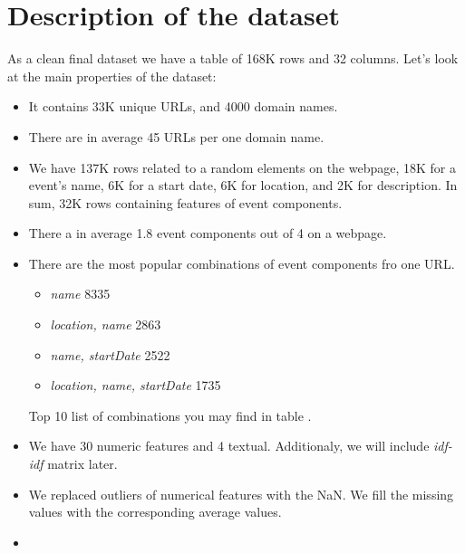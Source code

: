     



\section{Description of the dataset}
As a clean final dataset we have a table of 168K rows and 32 columns. Let's look at the main properties of the dataset: 

\begin{itemize}
    \item It contains 33K unique URLs, and  4000 domain names. 
    \item There are in average 45 URLs per one domain name. 
    \item We have 137K rows related to a random elements on the webpage, 18K for a event's name, 6K for a start date, 6K for location, and 2K for description. In sum, 32K rows containing features of event components. 
    \item There a in average 1.8 event components out of 4 on a webpage. 
    \item There are the most popular combinations of event components fro one URL. 
    \begin{itemize}
        \item \textit{name} 8335
        \item \textit{location, name} 2863 
        \item \textit{name, startDate} 2522 
        \item \textit{location, name, startDate} 1735
    \end{itemize}
    Top 10 list of combinations you may find in table .
    \item We have 30 numeric features and 4 textual. Additionaly, we will include \textit{idf-idf} matrix later.
    \item We replaced outliers of numerical features with the NaN. We fill the missing values with the corresponding average values.  
    \item 
\end{itemize}


